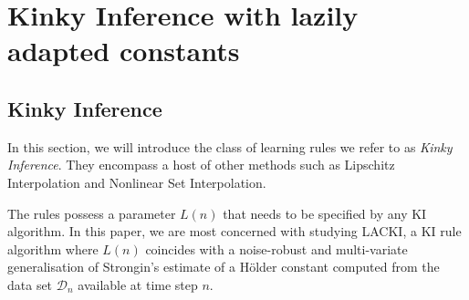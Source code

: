 \documentclass{article} %
\theoremstyle{definition}
\theoremstyle{remark}
\newcommand{\norm}[1]{\left\Vert#1\right\Vert}
\newcommand{\Real}{\mathbb R}
\newcommand{\data}{\ensuremath{ \mathcal D} }
\newcommand{\inspace}{\ensuremath{ \mathcal X}}
\newcommand{\outspace}{\ensuremath{ \mathcal Y}}
\newcommand{\metric}{\, \mathfrak{d}} %
\begin{document}
\section{Kinky Inference with lazily adapted constants}


\label{sec:LACKI_all}

\subsection{Kinky Inference}
\label{sec:KI_core}
In this section, we will introduce the class of learning rules we refer to as \emph{Kinky Inference}. They encompass a host of other methods such as Lipschitz Interpolation and Nonlinear Set Interpolation.  
%

The rules possess a parameter $L(n)$ that needs to be specified by any KI algorithm. In this paper, we are most concerned with studying LACKI, a KI rule algorithm where $L(n)$ coincides with a noise-robust and multi-variate generalisation of Strongin's estimate \cite{Strongin1973} of a H\"older constant computed from the data set $\data_n$ available at time step $n$. 

\end{document}
